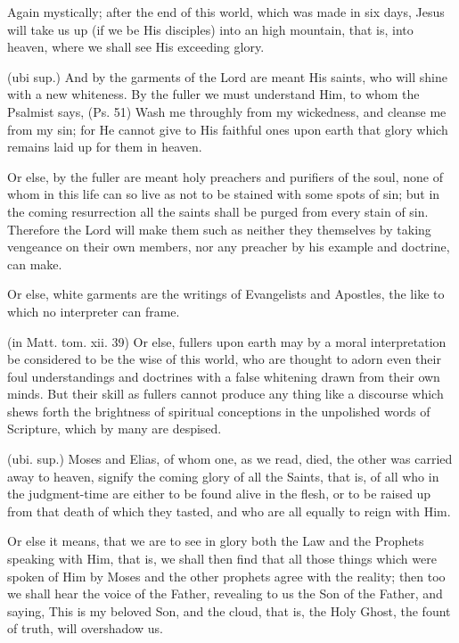  Again mystically; after the end of this world, which was made in six days, Jesus will take us up (if we be His disciples) into an high mountain, that is, into heaven, where we shall see His exceeding glory.

 (ubi sup.) And by the garments of the Lord are meant His saints, who will shine with a new whiteness. By the fuller we must understand Him, to whom the Psalmist says, (Ps. 51) Wash me throughly from my wickedness, and cleanse me from my sin; for He cannot give to His faithful ones upon earth that glory which remains laid up for them in heaven.

 Or else, by the fuller are meant holy preachers and purifiers of the soul, none of whom in this life can so live as not to be stained with some spots of sin; but in the coming resurrection all the saints shall be purged from every stain of sin. Therefore the Lord will make them such as neither they themselves by taking vengeance on their own members, nor any preacher by his example and doctrine, can make.

 Or else, white garments are the writings of Evangelists and Apostles, the like to which no interpreter can frame.

 (in Matt. tom. xii. 39) Or else, fullers upon earth may by a moral interpretation be considered to be the wise of this world, who are thought to adorn even their foul understandings and doctrines with a false whitening drawn from their own minds. But their skill as fullers cannot produce any thing like a discourse which shews forth the brightness of spiritual conceptions in the unpolished words of Scripture, which by many are despised.

 (ubi. sup.) Moses and Elias, of whom one, as we read, died, the other was carried away to heaven, signify the coming glory of all the Saints, that is, of all who in the judgment-time are either to be found alive in the flesh, or to be raised up from that death of which they tasted, and who are all equally to reign with Him.

 Or else it means, that we are to see in glory both the Law and the Prophets speaking with Him, that is, we shall then find that all those things which were spoken of Him by Moses and the other prophets agree with the reality; then too we shall hear the voice of the Father, revealing to us the Son of the Father, and saying, This is my beloved Son, and the cloud, that is, the Holy Ghost, the fount of truth, will overshadow us.

